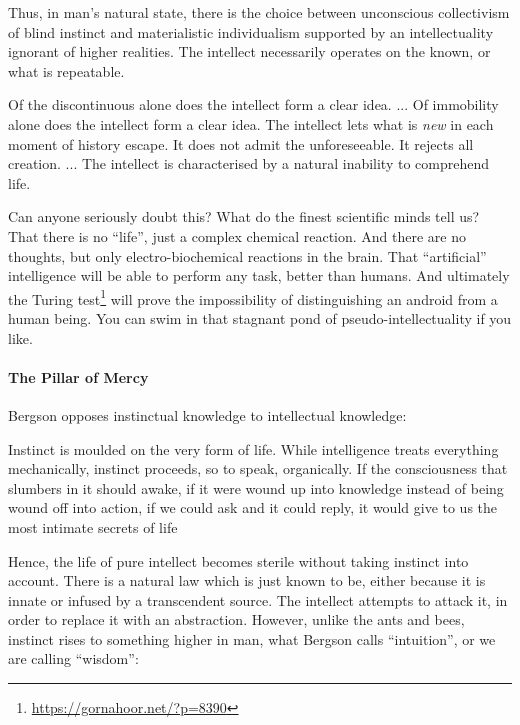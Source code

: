 Thus, in man's natural state, there is the choice between unconscious collectivism of blind instinct and materialistic individualism supported by an intellectuality ignorant of higher realities. The intellect necessarily operates on the known, or what is repeatable.

\begin{quotex}
Of the discontinuous alone does the intellect form a clear idea. ... Of immobility alone does the intellect form a clear idea. The intellect lets what is \emph{new} in each moment of history escape. It does not admit the unforeseeable. It rejects all creation. ... The intellect is characterised by a natural inability to comprehend life.
\end{quotex}


Can anyone seriously doubt this? What do the finest scientific minds tell us? That there is no ``life'', just a complex chemical reaction. And there are no thoughts, but only electro-biochemical reactions in the brain. That ``artificial'' intelligence will be able to perform any task, better than humans. And ultimately the Turing test\footnote{\url{https://gornahoor.net/?p=8390}} will prove the impossibility of distinguishing an android from a human being. You can swim in that stagnant pond of pseudo-intellectuality if you like.

\paragraph{The Pillar of Mercy}


Bergson opposes instinctual knowledge to intellectual knowledge:

\begin{quotex}
Instinct is moulded on the very form of life. While intelligence treats everything mechanically, instinct proceeds, so to speak, organically. If the consciousness that slumbers in it should awake, if it were wound up into knowledge instead of being wound off into action, if we could ask and it could reply, it would give to us the most intimate secrets of life
\end{quotex}


Hence, the life of pure intellect becomes sterile without taking instinct into account. There is a natural law which is just known to be, either because it is innate or infused by a transcendent source. The intellect attempts to attack it, in order to replace it with an abstraction. However, unlike the ants and bees, instinct rises to something higher in man, what Bergson calls ``intuition'', or we are calling ``wisdom'':

